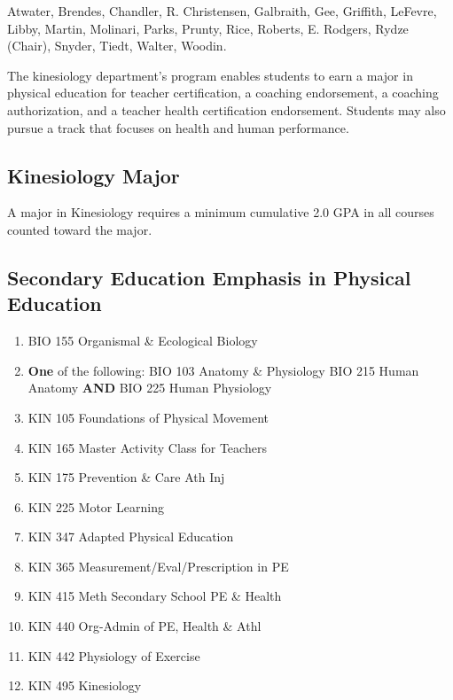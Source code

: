 \documentclass[
  letterpaper,
]{scrbook}
\providecommand{\tightlist}{%
  \setlength{\itemsep}{0pt}\setlength{\parskip}{0pt}}
\begin{document}
Atwater, Brendes, Chandler, R. Christensen, Galbraith, Gee, Griffith,
LeFevre, Libby, Martin, Molinari, Parks, Prunty, Rice, Roberts, E.
Rodgers, Rydze (Chair), Snyder, Tiedt, Walter, Woodin.

The kinesiology department's program enables students to earn a major in
physical education for teacher certification, a coaching endorsement, a
coaching authorization, and a teacher health certification endorsement.
Students may also pursue a track that focuses on health and human
performance.

\hypertarget{kinesiology-major}{%
\subsection{Kinesiology Major}\label{kinesiology-major}}

A major in Kinesiology requires a minimum cumulative 2.0 GPA in all
courses counted toward the major.

\hypertarget{secondary-education-emphasis-in-physical-education}{%
\subsection{Secondary Education Emphasis in Physical
Education}\label{secondary-education-emphasis-in-physical-education}}

\begin{enumerate}
\def\labelenumi{\arabic{enumi}.}
\tightlist
\item
  BIO 155 Organismal \& Ecological Biology
\item
  \textbf{One} of the following: BIO 103 Anatomy \& Physiology BIO 215
  Human Anatomy \textbf{AND} BIO 225 Human Physiology
\item
  KIN 105 Foundations of Physical Movement
\item
  KIN 165 Master Activity Class for Teachers
\item
  KIN 175 Prevention \& Care Ath Inj
\item
  KIN 225 Motor Learning
\item
  KIN 347 Adapted Physical Education
\item
  KIN 365 Measurement/Eval/Prescription in PE
\item
  KIN 415 Meth Secondary School PE \& Health
\item
  KIN 440 Org-Admin of PE, Health \& Athl
\item
  KIN 442 Physiology of Exercise
\item
  KIN 495 Kinesiology
\end{enumerate}
\end{document}
